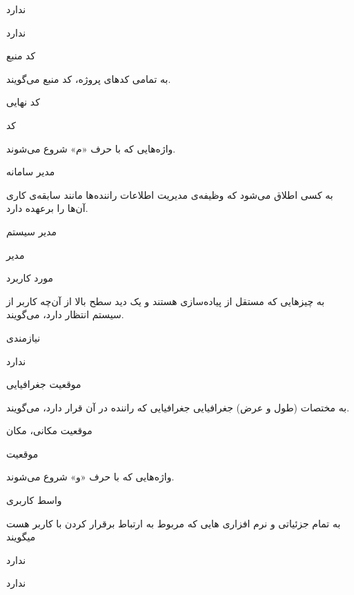 ندارد

ندارد

\noindent \hrulefill

کد منبع

به تمامی کدهای پروژه، کد منبع می‌گویند.

کد نهایی

کد

\newpage

واژه‌هایی که با حرف «م» شروع می‌شوند.
\noindent \hrulefill

مدیر سامانه

به کسی اطلاق می‌شود که وظیفه‌ی مدیریت اطلاعات راننده‌ها مانند سابقه‌ی کاری آن‌ها را برعهده دارد.

مدیر سیستم

مدیر

\noindent \hrulefill

مورد کاربرد

به چیزهایی که مستقل از پياده‌سازی هستند و يک ديد سطح بالا از آن‌چه كاربر از سيستم انتظار دارد، می‌گویند.

نیازمندی

ندارد

\noindent \hrulefill

موقعیت جغرافیایی

به مختصات (طول و عرض) جغرافیایی جغرافیایی که راننده در آن قرار دارد، می‌گویند.

موقعیت مکانی، مکان

موقعیت

\newpage

واژه‌هایی که با حرف «و» شروع می‌شوند.
\noindent \hrulefill

واسط کاربری

به تمام جزئیاتی و نرم افزاری هایی که مربوط به ارتباط برقرار کردن با کاربر هست میگویند

ندارد

ندارد

